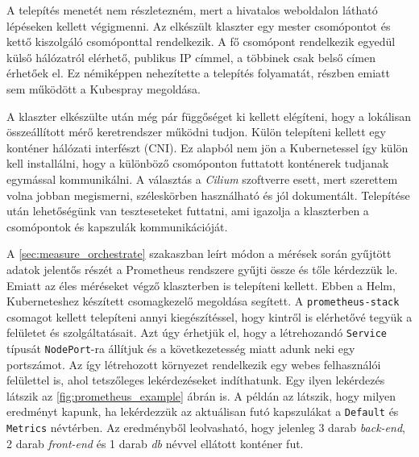A telepítés menetét nem részletezném, mert a hivatalos weboldalon látható lépéseken kellett végigmenni. Az elkészült klaszter egy mester csomópontot és kettő kiszolgáló csomóponttal rendelkezik. A fő csomópont rendelkezik egyedül külső hálózatról elérhető, publikus IP címmel, a többinek csak belső címen érhetőek el. Ez némiképpen nehezítette a telepítés folyamatát, részben emiatt sem működött a Kubespray megoldása. 

A klaszter elkészülte után még pár függőséget ki kellett elégíteni, hogy a lokálisan összeállított mérő keretrendszer működni tudjon. Külön telepíteni kellett egy konténer hálózati interfészt (CNI). Ez alapból nem jön a Kubernetessel így külön kell installálni, hogy a különböző csomóponton futtatott konténerek tudjanak egymással kommunikálni. A választás a \textit{Cilium} szoftverre esett, mert szerettem volna jobban megismerni, széleskörben használható és jól dokumentált. Telepítése után lehetőségünk van teszteseteket futtatni, ami igazolja a klaszterben a csomópontok és kapszulák kommunikációját. 

A \ref{sec:measure_orchestrate} szakaszban leírt módon a mérések során gyűjtött adatok jelentős részét a Prometheus rendszere gyűjti össze és tőle kérdezzük le. Emiatt az éles méréseket végző klaszterben is telepíteni kellett. Ebben a Helm, Kuberneteshez készített csomagkezelő megoldása segített. A \verb+prometheus-stack+ csomagot kellett telepíteni annyi kiegészítéssel, hogy kintről is elérhetővé tegyük a felületet és szolgáltatásait. Azt úgy érhetjük el, hogy a létrehozandó \verb+Service+  típusát \verb+NodePort+-ra állítjuk és a következetesség miatt adunk neki egy portszámot. Az így létrehozott környezet rendelkezik egy webes felhasználói felülettel is, ahol tetszőleges lekérdezéseket indíthatunk. Egy ilyen lekérdezés látszik az \ref{fig:prometheus_example} ábrán is. A példán az látszik, hogy milyen eredményt kapunk, ha lekérdezzük az aktuálisan futó kapszulákat a \verb+Default+ és \verb+Metrics+ névtérben. Az eredményből leolvasható, hogy jelenleg 3 darab \textit{back-end}, 2 darab \textit{front-end} és 1 darab \textit{db} névvel ellátott konténer fut. \\


